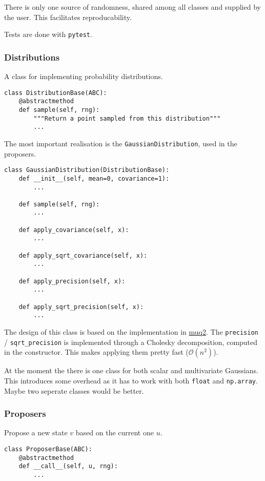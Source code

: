 \documentclass[11pt]{article}
\begin{document}
There is only one source of randomness, shared among all classes and supplied by the user.
This facilitates reproducability.

Tests are done with \texttt{pytest}.
\subsubsection{Distributions}
\label{sec:org8f9bfa5}
A class for implementing probability distributions.
\begin{verbatim}
class DistributionBase(ABC):
    @abstractmethod
    def sample(self, rng):
        """Return a point sampled from this distribution"""
        ...
\end{verbatim}

The most important realisation is the \texttt{GaussianDistribution}, used
in the proposers.

\begin{verbatim}
class GaussianDistribution(DistributionBase):
    def __init__(self, mean=0, covariance=1):
        ...

    def sample(self, rng):
        ...

    def apply_covariance(self, x):
        ...

    def apply_sqrt_covariance(self, x):
        ...

    def apply_precision(self, x):
        ...

    def apply_sqrt_precision(self, x):
        ...
\end{verbatim}

The design of this class is based on the implementation in \href{http://muq.mit.edu/master-muq2-docs/CrankNicolson\_8py\_source.html}{muq2}. The \texttt{precision} / \texttt{sqrt\_precision}
is implemented through a Cholesky decomposition, computed in the constructor. This makes
applying them pretty fast (\(\mathcal{O}(n^2)\)).

At the moment the there is one class for both scalar and multivariate Gaussians. This
introduces some overhead as it has to work with both \texttt{float} and \texttt{np.array}. Maybe two
seperate classes would be better.
\subsubsection{Proposers}
\label{sec:org58a3d5a}

Propose a new state \(v\) based on the current one \(u\).

\begin{verbatim}
class ProposerBase(ABC):
    @abstractmethod
    def __call__(self, u, rng):
        ...
\end{verbatim}
\end{document}
